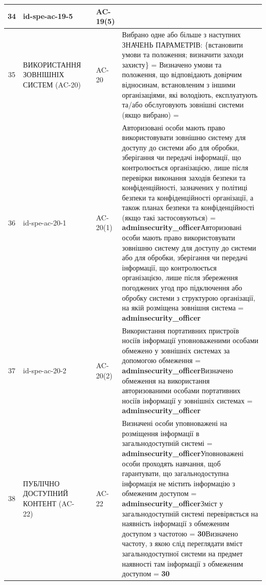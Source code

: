 \documentclass[10pt]{article}
\begin{document}
\begin{longtable}{|c|>{\raggedright\arraybackslash}p{4cm}|>{\raggedright\arraybackslash}p{2.5cm}|>{\raggedright\arraybackslash}p{3.5cm}|>{\raggedright\arraybackslash}p{5.5cm}|}
34 & id-spe-ac-19-5 &  & AC-19(5) &  \\ \hline
35 & ВИКОРИСТАННЯ ЗОВНІШНІХ СИСТЕМ (AC-20) &  & AC-20 & Вибрано одне або більше з наступних ЗНАЧЕНЬ ПАРАМЕТРІВ: \{встановити умови та положення; визначити заходи захисту\} = \textbf{}\newline Визначено умови та положення, що відповідають довірчим відносинам, встановленим з іншими організаціями, які володіють, експлуатують та/або обслуговують зовнішні системи (якщо вибрано) = \textbf{} \\ \hline
36 & id-spe-ac-20-1 &  & AC-20(1) & Авторизовані особи мають право використовувати зовнішню систему для доступу до системи або для обробки, зберігання чи передачі інформації, що контролюється організацією, лише після перевірки виконання заходів безпеки та конфіденційності, зазначених у політиці безпеки та конфіденційності організації, а також планах безпеки та конфіденційності (якщо такі застосовуються) = \textbf{adminsecurity\_\allowbreak{}officer}\newline Авторизовані особи мають право використовувати зовнішню систему для доступу до системи або для обробки, зберігання чи передачі інформації, що контролюється організацією, лише після збереження погоджених угод про підключення або обробку системи з структурою організації, на якій розміщена зовнішня система = \textbf{adminsecurity\_\allowbreak{}officer} \\ \hline
37 & id-spe-ac-20-2 &  & AC-20(2) & Використання портативних пристроїв носіїв інформації уповноваженими особами обмежено у зовнішніх системах за допомогою обмеження  = \textbf{adminsecurity\_\allowbreak{}officer}\newline Визначено обмеження на використання авторизованими особами портативних носіїв інформації у зовнішніх системах = \textbf{adminsecurity\_\allowbreak{}officer} \\ \hline
38 & ПУБЛІЧНО ДОСТУПНИЙ КОНТЕНТ (AC-22) &  & AC-22 & Визначені особи уповноважені на розміщення інформації в загальнодоступній системі = \textbf{adminsecurity\_\allowbreak{}officer}\newline Уповноважені особи проходять навчання, щоб гарантувати, що загальнодоступна інформація не містить інформацію з обмеженим доступом = \textbf{adminsecurity\_\allowbreak{}officer}\newline Зміст у загальнодоступній системі перевіряється на наявність інформації з обмеженим доступом з частотою = \textbf{30}\newline Визначено частоту, з якою слід переглядати вміст загальнодоступної системи на предмет наявності там інформації з обмеженим доступом = \textbf{30} \\ \hline

\end{longtable}
\end{document}
